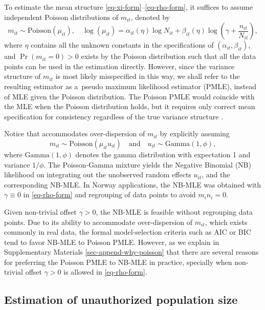 To estimate the mean structure \eqref{eq-xi-form}--\eqref{eq-rho-form}, it suffices to assume independent Poisson distributions of $m_{it}$, denoted by 
\begin{equation}\label{eq-poisson-model}
m_{it} \sim \text{Poisson}(\mu_{it}), \quad \log(\mu_{it}) = \alpha_{it}(\eta) \log N_{it} + \beta_{it}(\eta) \log\left(\gamma + \frac{n_{it}}{N_{it}}\right),
\end{equation}
where $\eta$ contains all the unknown constants in the specifications of $(\alpha_{it}, \beta_{it})$, and $\Pr(m_{it}=0) >0$ exists by the Poisson distribution such that all the data points can be used in the estimation directly. However, since the variance structure of $m_{it}$ is most likely misspecified in this way, we shall refer to the resulting estimator as a~pseudo maximum likelihood estimator (PMLE), instead of MLE given the Poisson distribution. The Poisson PMLE would coincide with the MLE when the Poisson distribution holds, but it requires only correct mean specification for consistency regardless of the true variance structure \citep{SantosSilvaTenreyro2006}. 

Notice that \citet{Zhang2008} accommodates over-dispersion of $m_{it}$ by explicitly assuming 
\[
m_{it} \sim \text{Poisson}(\mu_{it} u_{it}) \quad\text{and}\quad u_{it} \sim \text{Gamma}(1, \phi),
\]
where $\text{Gamma}(1, \phi)$ denotes the gamma distribution with expectation 1 and variance $1/\phi$. The Poisson-Gamma mixture yields the Negative Binomial (NB) likelihood on integrating out the unobserved random effects $u_{it}$, and the corresponding NB-MLE. In Norway applications, the NB-MLE was obtained with $\gamma \equiv 0$ in \eqref{eq-rho-form} and regrouping of data points to avoid $m_i n_i =0$. 

Given non-trivial offset $\gamma >0$, the NB-MLE is feasible without regrouping data points. Due to its ability to accommodate over-dispersion of $m_{it}$, which exists commonly in real data, the formal model-selection criteria such as AIC or BIC tend to favor NB-MLE to Poisson PMLE. However, as we explain in Supplementary Materials \ref{sec-append-why-poisson} that there are several reasons for preferring the Poisson PMLE to NB-MLE in practice, specially when non-trivial offset $\gamma >0$ is allowed in \eqref{eq-rho-form}. 


 
\subsection{Estimation of unauthorized population size}\label{estimating-the-unauthorized-population-size-and-its-variance}

